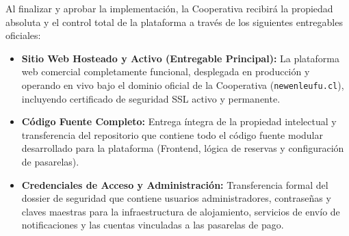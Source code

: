 \documentclass[11pt,a4paper]{article}
\begin{document}
Al finalizar y aprobar la implementación, la Cooperativa recibirá la propiedad absoluta y el control total de la plataforma a través de los siguientes entregables oficiales:

\begin{itemize}
    \item \textbf{Sitio Web Hosteado y Activo (Entregable Principal):} La plataforma web comercial completamente funcional, desplegada en producción y operando en vivo bajo el dominio oficial de la Cooperativa (\texttt{newenleufu.cl}), incluyendo certificado de seguridad SSL activo y permanente.
    \item \textbf{Código Fuente Completo:} Entrega íntegra de la propiedad intelectual y transferencia del repositorio que contiene todo el código fuente modular desarrollado para la plataforma (Frontend, lógica de reservas y configuración de pasarelas).
    \item \textbf{Credenciales de Acceso y Administración:} Transferencia formal del dossier de seguridad que contiene usuarios administradores, contraseñas y claves maestras para la infraestructura de alojamiento, servicios de envío de notificaciones y las cuentas vinculadas a las pasarelas de pago.
\end{itemize}
\end{document}
